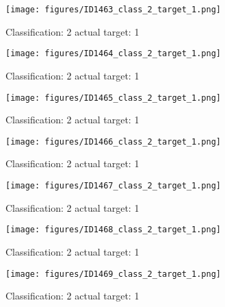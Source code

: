 \begin{figure}[h!]
\begin{center}
\texttt{[image: figures/ID1463\_class\_2\_target\_1.png]}
\end{center}
\caption{ Classification: 2 actual target: 1}
\label{fig:ID1463_class_2_target_1}
\end{figure}
\begin{figure}[h!]
\begin{center}
\texttt{[image: figures/ID1464\_class\_2\_target\_1.png]}
\end{center}
\caption{ Classification: 2 actual target: 1}
\label{fig:ID1464_class_2_target_1}
\end{figure}
\begin{figure}[h!]
\begin{center}
\texttt{[image: figures/ID1465\_class\_2\_target\_1.png]}
\end{center}
\caption{ Classification: 2 actual target: 1}
\label{fig:ID1465_class_2_target_1}
\end{figure}
\begin{figure}[h!]
\begin{center}
\texttt{[image: figures/ID1466\_class\_2\_target\_1.png]}
\end{center}
\caption{ Classification: 2 actual target: 1}
\label{fig:ID1466_class_2_target_1}
\end{figure}
\begin{figure}[h!]
\begin{center}
\texttt{[image: figures/ID1467\_class\_2\_target\_1.png]}
\end{center}
\caption{ Classification: 2 actual target: 1}
\label{fig:ID1467_class_2_target_1}
\end{figure}
\begin{figure}[h!]
\begin{center}
\texttt{[image: figures/ID1468\_class\_2\_target\_1.png]}
\end{center}
\caption{ Classification: 2 actual target: 1}
\label{fig:ID1468_class_2_target_1}
\end{figure}
\begin{figure}[h!]
\begin{center}
\texttt{[image: figures/ID1469\_class\_2\_target\_1.png]}
\end{center}
\caption{ Classification: 2 actual target: 1}
\label{fig:ID1469_class_2_target_1}
\end{figure}
